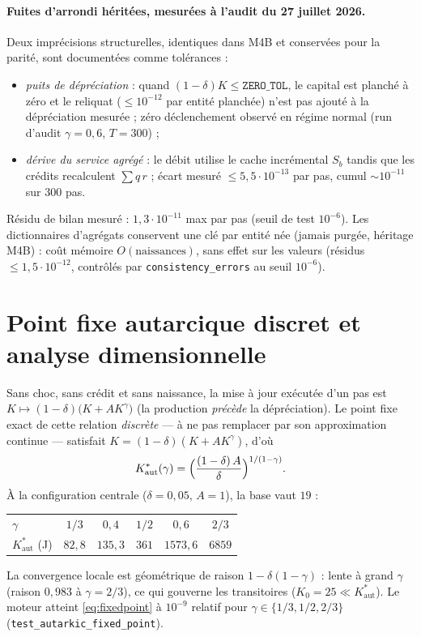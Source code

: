 \documentclass[11pt,a4paper]{article}
\newcommand{\code}[1]{\texttt{#1}}
\newcommand{\Kaut}{K^{*}_{\mathrm{aut}}}
\begin{document}
\paragraph{Fuites d'arrondi héritées, mesurées à l'audit du 27 juillet
2026.} Deux imprécisions structurelles, identiques dans M4B et conservées
pour la parité, sont documentées comme tolérances :
\begin{itemize}
\item \emph{puits de dépréciation} : quand $(1-\delta)K\le\code{ZERO\_TOL}$,
le capital est planché à zéro et le reliquat ($\le10^{-12}$ par entité
planchée) n'est pas ajouté à la dépréciation mesurée ; zéro déclenchement
observé en régime normal (run d'audit $\gamma=0{,}6$, $T=300$) ;
\item \emph{dérive du service agrégé} : le débit utilise le cache
incrémental $S_b$ tandis que les crédits recalculent $\sum q\,r$ ; écart
mesuré $\le5{,}5\cdot10^{-13}$ par pas, cumul $\sim10^{-11}$ sur 300 pas.
\end{itemize}
Résidu de bilan mesuré : $1{,}3\cdot10^{-11}$ max par pas (seuil de test
$10^{-6}$). Les dictionnaires d'agrégats conservent une clé par entité
née (jamais purgée, héritage M4B) : coût mémoire $O(\text{naissances})$,
sans effet sur les valeurs (résidus $\le1{,}5\cdot10^{-12}$, contrôlés par
\code{consistency\_errors} au seuil $10^{-6}$).

\section{Point fixe autarcique discret et analyse dimensionnelle}
\label{sec:fixedpoint}

Sans choc, sans crédit et sans naissance, la mise à jour exécutée d'un pas
est $K\mapsto(1-\delta)\bigl(K+A K^\gamma\bigr)$ (la production
\emph{précède} la dépréciation). Le point fixe exact de cette relation
\emph{discrète} — à ne pas remplacer par son approximation continue —
satisfait $K=(1-\delta)(K+AK^\gamma)$, d'où
\begin{equation}
\Kaut(\gamma)=\Bigl(\frac{(1-\delta)\,A}{\delta}\Bigr)^{1/(1-\gamma)} .
\label{eq:fixedpoint}
\end{equation}
À la configuration centrale ($\delta=0{,}05$, $A=1$), la base vaut $19$ :
\begin{center}
\begin{tabular}{lccccc}
\toprule
$\gamma$ & $1/3$ & $0{,}4$ & $1/2$ & $0{,}6$ & $2/3$\\
$\Kaut$ (J) & $82{,}8$ & $135{,}3$ & $361$ & $1573{,}6$ & $6859$\\
\bottomrule
\end{tabular}
\end{center}
La convergence locale est géométrique de raison
$1-\delta(1-\gamma)$ : lente à grand $\gamma$ (raison $0{,}983$ à
$\gamma=2/3$), ce qui gouverne les transitoires ($K_0=25\ll\Kaut$). Le
moteur atteint \eqref{eq:fixedpoint} à $10^{-9}$ relatif pour
$\gamma\in\{1/3,1/2,2/3\}$ (\code{test\_autarkic\_fixed\_point}).
\end{document}
